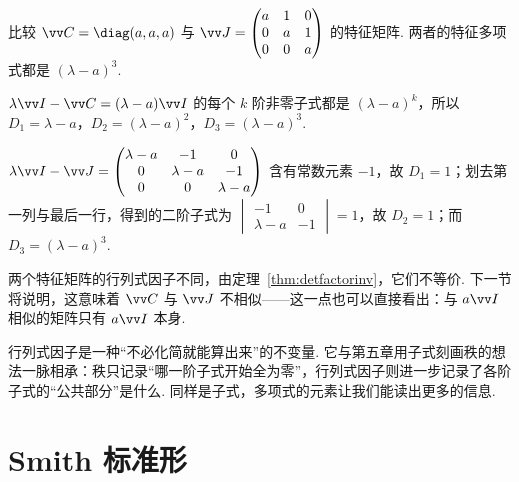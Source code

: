 	\begin{example}\label{eg:detfactor}
		比较 $\vv C=\diag(a,a,a)$ 与 $\vv J=\begin{pmatrix}a&1&0\\0&a&1\\0&0&a\end{pmatrix}$ 的特征矩阵. 两者的特征多项式都是 $(\lambda-a)^3$.
		
		$\lambda\vv I-\vv C=(\lambda-a)\vv I$ 的每个 $k$ 阶非零子式都是 $(\lambda-a)^k$，所以 $D_1=\lambda-a$，$D_2=(\lambda-a)^2$，$D_3=(\lambda-a)^3$.
		
		$\lambda\vv I-\vv J=\begin{pmatrix}\lambda-a&-1&0\\0&\lambda-a&-1\\0&0&\lambda-a\end{pmatrix}$ 含有常数元素 $-1$，故 $D_1=1$；划去第一列与最后一行，得到的二阶子式为 $\begin{vmatrix}-1&0\\\lambda-a&-1\end{vmatrix}=1$，故 $D_2=1$；而 $D_3=(\lambda-a)^3$.
		
		两个特征矩阵的行列式因子不同，由定理~\ref{thm:detfactorinv}，它们不等价. 下一节将说明，这意味着 $\vv C$ 与 $\vv J$ 不相似——这一点也可以直接看出：与 $a\vv I$ 相似的矩阵只有 $a\vv I$ 本身.
	\end{example}
	
	\begin{motivebox}
		行列式因子是一种“不必化简就能算出来”的不变量. 它与第五章用子式刻画秩的想法一脉相承：秩只记录“哪一阶子式开始全为零”，行列式因子则进一步记录了各阶子式的“公共部分”是什么. 同样是子式，多项式的元素让我们能读出更多的信息.
	\end{motivebox}
	
	\section{\hB Smith 标准形}\label{sec:smith}
	
